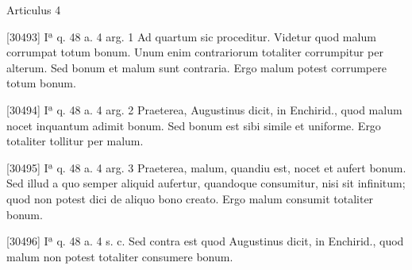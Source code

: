 \documentclass[paper=a4paper,fontsize=10pt,jafontsize=9pt,titlepage]{jlreq}
\begin{document}
Articulus 4

[30493] Iª q. 48 a. 4 arg. 1 Ad quartum sic proceditur. Videtur quod malum corrumpat totum bonum. Unum enim contrariorum totaliter corrumpitur per alterum. Sed bonum et malum sunt contraria. Ergo malum potest corrumpere totum bonum.

[30494] Iª q. 48 a. 4 arg. 2 Praeterea, Augustinus dicit, in Enchirid., quod malum nocet inquantum adimit bonum. Sed bonum est sibi simile et uniforme. Ergo totaliter tollitur per malum.

[30495] Iª q. 48 a. 4 arg. 3 Praeterea, malum, quandiu est, nocet et aufert bonum. Sed illud a quo semper aliquid aufertur, quandoque consumitur, nisi sit infinitum; quod non potest dici de aliquo bono creato. Ergo malum consumit totaliter bonum.

[30496] Iª q. 48 a. 4 s. c. Sed contra est quod Augustinus dicit, in Enchirid., quod malum non potest totaliter consumere bonum.
\end{document}
